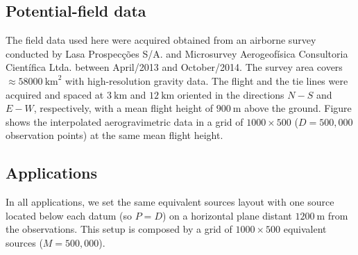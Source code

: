 \subsection{Potential-field data}

The field data used here were acquired obtained from an airborne survey conducted by Lasa Prospec{\c c}{\~o}es S/A. 
and Microsurvey Aerogeof{\'i}sica Consultoria Cient{\'i}fica Ltda. between April/2013 and October/2014.
The survey area covers $\approx 58000 \: \mathrm{km}^2$ with high-resolution gravity data. 
The flight and the tie lines were acquired and spaced at $3 \: \mathrm{km}$  and $12 \: \mathrm{km}$ oriented in the 
directions $N-S$ and $E-W$, respectively, with a mean flight height of $900 \: \mathrm{m}$ above the ground. 
Figure %
shows the interpolated aerogravimetric data in a grid of 
$1000 \times 500$ ($D = 500,000$ observation points) at the same mean flight height. 


\subsection{Applications}


In all applications, we set the same equivalent sources layout with one source located below each datum
(so $P=D$) on a horizontal plane distant $1200 \: \mathrm{m}$ from the observations.
This setup is composed by a grid of $1000 \times 500$ equivalent sources ($M = 500,000$). 

